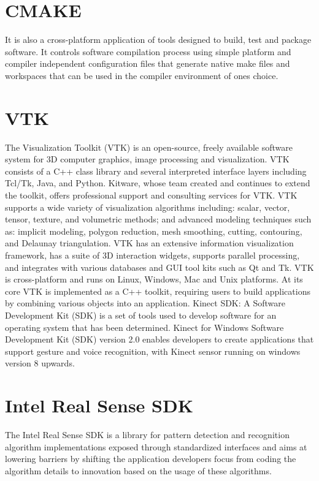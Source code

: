 \documentclass[a4paper]{report}
\begin{document}
\section{CMAKE}
It is also a cross-platform application of tools designed to build, test and package software. It controls software compilation process using simple platform and compiler independent configuration files that generate native make files and workspaces that can be used in the compiler environment of ones choice.
\section{VTK}
The Visualization Toolkit (VTK) is an open-source, freely available software system for 3D computer graphics, image processing and visualization. VTK consists of a C++ class library and several interpreted interface layers including Tcl/Tk, Java, and Python. Kitware, whose team created and continues to extend the toolkit, offers professional support and consulting services for VTK. VTK supports a wide variety of visualization algorithms including: scalar, vector, tensor, texture, and volumetric methods; and advanced modeling techniques such as: implicit modeling, polygon reduction, mesh smoothing, cutting, contouring, and Delaunay triangulation. VTK has an extensive information visualization framework, has a suite of 3D interaction widgets, supports parallel processing, and integrates with various databases and GUI tool kits such as Qt and Tk. VTK is cross-platform and runs on Linux, Windows, Mac and Unix platforms. At its core VTK is implemented as a C++ toolkit, requiring users to build applications by combining various objects into an application.
Kinect SDK: A Software Development Kit (SDK) is a set of tools used to develop software for an operating system that has been determined. Kinect for Windows Software Development Kit (SDK) version 2.0 enables developers to create applications that support gesture and voice recognition, with Kinect sensor running on windows version 8 upwards.
\section{Intel Real Sense SDK}
The Intel Real Sense SDK is a library for pattern detection and recognition algorithm implementations exposed through standardized interfaces and aims at lowering barriers by shifting the application developers focus from coding the algorithm details to innovation based on the usage of these algorithms\cite{ref10}.
\end{document}
